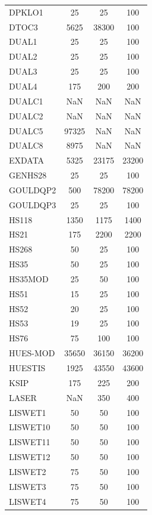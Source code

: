 \begin{longtable}{lccc}
DPKLO1   &    25 &    25 &    100 \\
DTOC3    &  5625 & 38300 &    100 \\
DUAL1    &    25 &    25 &    100 \\
DUAL2    &    25 &    25 &    100 \\
DUAL3    &    25 &    25 &    100 \\
DUAL4    &   175 &   200 &    200 \\
DUALC1   &   NaN &   NaN &    NaN \\
DUALC2   &   NaN &   NaN &    NaN \\
DUALC5   & 97325 &   NaN &    NaN \\
DUALC8   &  8975 &   NaN &    NaN \\
EXDATA   &  5325 & 23175 &  23200 \\
GENHS28  &    25 &    25 &    100 \\
GOULDQP2 &   500 & 78200 &  78200 \\
GOULDQP3 &    25 &    25 &    100 \\
HS118    &  1350 &  1175 &   1400 \\
HS21     &   175 &  2200 &   2200 \\
HS268    &    50 &    25 &    100 \\
HS35     &    50 &    25 &    100 \\
HS35MOD  &    25 &    50 &    100 \\
HS51     &    15 &    25 &    100 \\
HS52     &    20 &    25 &    100 \\
HS53     &    19 &    25 &    100 \\
HS76     &    75 &   100 &    100 \\
HUES-MOD & 35650 & 36150 &  36200 \\
HUESTIS  &  1925 & 43550 &  43600 \\
KSIP     &   175 &   225 &    200 \\
LASER    &   NaN &   350 &    400 \\
LISWET1  &    50 &    50 &    100 \\
LISWET10 &    50 &    50 &    100 \\
LISWET11 &    50 &    50 &    100 \\
LISWET12 &    50 &    50 &    100 \\
LISWET2  &    75 &    50 &    100 \\
LISWET3  &    75 &    50 &    100 \\
LISWET4  &    75 &    50 &    100 \\

\end{longtable}
